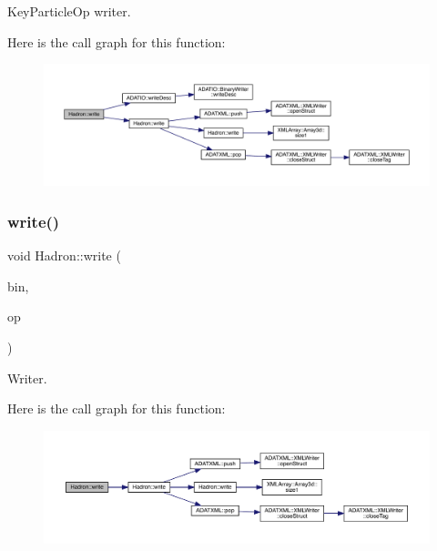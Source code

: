 Key\+Particle\+Op writer. 

Here is the call graph for this function\+:\nopagebreak
\begin{figure}[H]
\begin{center}
\leavevmode
\includegraphics[width=350pt]{d1/daf/namespaceHadron_a4330be9331eb4c839e7e123f5306560b_cgraph}
\end{center}
\end{figure}
\mbox{\label{namespaceHadron_a780fbaaa0f7e3ba3453b4994b3ecd7d0}} 
\subsubsection{\texorpdfstring{write()}{write()}\hspace{0.1cm}{\footnotesize\ttfamily [45/95]}}
{\footnotesize\ttfamily void Hadron\+::write (\begin{DoxyParamCaption}\item[{\mbox{\hyperlink{classADATIO_1_1BinaryWriter}{Binary\+Writer}} \&}]{bin,  }\item[{const \mbox{\hyperlink{structHadron_1_1KeySingleHadronQuarkSpin__t}{Key\+Single\+Hadron\+Quark\+Spin\+\_\+t}} \&}]{op }\end{DoxyParamCaption})}



Writer. 

Here is the call graph for this function\+:\nopagebreak
\begin{figure}[H]
\begin{center}
\leavevmode
\includegraphics[width=350pt]{d1/daf/namespaceHadron_a780fbaaa0f7e3ba3453b4994b3ecd7d0_cgraph}
\end{center}
\end{figure}
\mbox{\label{namespaceHadron_a91e2c5264aeab6dfb2be779cf7140626}} 
